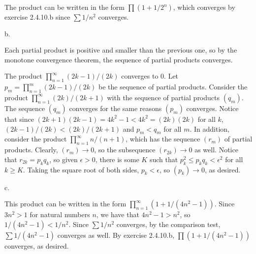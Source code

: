The product can be written in the form $\prod (1 + 1/2^n)$,
which converges by exercise 2.4.10.b since $\sum 1/n^2$ converges.
\medskip
\item{} b.

Each partial product is positive and smaller than the previous one,
so by the monotone convergence theorem, the sequence of partial products converges.

The product $\prod _{n=1} ^\infty (2k-1)/(2k)$ converges to $0$.
Let $p_m = \prod _{n=1} ^m (2k-1)/(2k)$ be the sequence of partial products.
Consider the product $\prod _{n=1} ^\infty (2k)/(2k+1)$
with the sequence of partial products $(q_m)$.
The sequence $(q_m)$ converges for the same reasons $(p_m)$ converges.
Notice that since $(2k + 1)(2k - 1) = 4k^2 - 1 < 4k^2 = (2k)(2k)$ for all $k$,
$(2k-1)/(2k) < (2k)/(2k+1)$ and $p_m < q_m$ for all $m$.
In addition, consider the product $\prod _{n=1} ^\infty n/(n+1)$,
which has the sequence $(r_m)$ of partial products.
Clearly, $(r_m) \to 0$, so the subsequence $(r_{2k}) \to 0$ as well.
Notice that $r_{2k} = p_k q_k$, so given $\epsilon > 0$,
there is some $K$ such that $p_k ^2 \le p_k q_k < \epsilon^2$
for all $k \ge K$.
Taking the square root of both sides, $p_k < \epsilon$, so $(p_k) \to 0$, as desired.
\medskip
\item{} c.

This product can be written in the form $\prod _{n=1} ^\infty (1 + 1/(4n^2 - 1))$.
Since $3n^2 > 1$ for natural numbers $n$, we have that $4n^2 - 1 > n^2$,
so $1/(4n^2 - 1) < 1/n^2$.
Since $\sum 1/n^2$ converges, by the comparison test, $\sum 1/(4n^2 - 1)$ converges as well.
By exercise 2.4.10.b, $\prod (1 + 1/(4n^2 - 1))$ converges, as desired.
\bye
